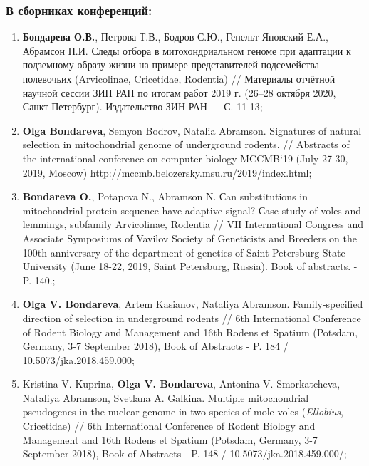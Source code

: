 \begin{small}
\subsubsection*{В сборниках конференций:}
\begin{enumerate}
	
\item[\textbullet] \textbf{Бондарева О.В.}, Петрова Т.В., Бодров С.Ю., Генельт-Яновский Е.А., Абрамсон Н.И. Следы отбора в митохондриальном геноме при адаптации к подземному образу жизни на примере представителей подсемейства полевочьих (Arvicolinae, Cricetidae, Rodentia) // Материалы отчётной научной сессии ЗИН РАН по итогам работ 2019 г. (26--28 октября 2020, Санкт-Петербург). Издательство ЗИН РАН --- С. 11-13;

\item[\textbullet] \textbf{Olga Bondareva}, Semyon Bodrov, Natalia Abramson. Signatures of natural selection in mitochondrial genome of underground rodents. // Abstracts of the international conference on computer biology MCCMB`19 (July 27-30, 2019, Moscow) http://mccmb.belozersky.msu.ru/2019/index.html;

\item[\textbullet] \textbf{Bondareva O.}, Potapova N., Abramson N. Сan substitutions in mitochondrial protein sequence have adaptive signal? Сase study of voles and lemmings, subfamily Arvicolinae, Rodentia // VII International Congress and Associate Symposiums of Vavilov Society of Geneticists and Breeders on the 100th anniversary of the department of genetics of Saint Petersburg State University (June 18-22, 2019, Saint Petersburg, Russia). Book of abstracts. - P. 140.;

\item[\textbullet] \textbf{Olga V. Bondareva}, Artem Kasianov, Nataliya Abramson. Family-specified direction of selection in underground rodents // 6th International Conference of Rodent Biology and Management and 16th Rodens et Spatium (Potsdam, Germany, 3-7 September 2018), Book of Abstracts - P. 184 / 10.5073/jka.2018.459.000;

\item[\textbullet] Kristina V. Kuprina, \textbf{Olga V. Bondareva}, Antonina V. Smorkatcheva, Nataliya Abramson, Svetlana A. Galkina. Multiple mitochondrial pseudogenes in the nuclear genome in two species of mole voles (\textit{Ellobius}, Cricetidae) // 6th International Conference of Rodent Biology and Management and 16th Rodens et Spatium (Potsdam, Germany, 3-7 September 2018), Book of Abstracts - P. 148 / 10.5073/jka.2018.459.000/;


\end{enumerate}
\end{small}
